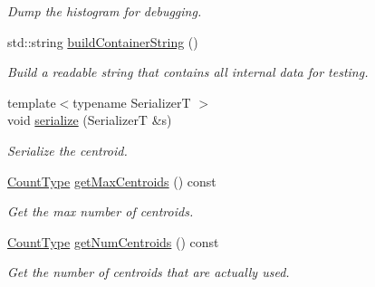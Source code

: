 \begin{DoxyCompactItemize}
\begin{DoxyCompactList}\small\item\em Dump the histogram for debugging. \end{DoxyCompactList}\item 
std\+::string \hyperlink{structvt_1_1util_1_1adt_1_1_histogram_approx_ada0f64fb2e7d5f1e7827bec2762a1291}{build\+Container\+String} ()
\begin{DoxyCompactList}\small\item\em Build a readable string that contains all internal data for testing. \end{DoxyCompactList}\item 
{\footnotesize template$<$typename SerializerT $>$ }\\void \hyperlink{structvt_1_1util_1_1adt_1_1_histogram_approx_aae8a321f42f550b711aeeb50ac8ef913}{serialize} (SerializerT \&s)
\begin{DoxyCompactList}\small\item\em Serialize the centroid. \end{DoxyCompactList}\item 
\hyperlink{structvt_1_1util_1_1adt_1_1_histogram_approx_aa2fb74665588d311da76dd821f2912c6}{Count\+Type} \hyperlink{structvt_1_1util_1_1adt_1_1_histogram_approx_a5b6af36eb1219d09bf17349731ed66ff}{get\+Max\+Centroids} () const
\begin{DoxyCompactList}\small\item\em Get the max number of centroids. \end{DoxyCompactList}\item 
\hyperlink{structvt_1_1util_1_1adt_1_1_histogram_approx_aa2fb74665588d311da76dd821f2912c6}{Count\+Type} \hyperlink{structvt_1_1util_1_1adt_1_1_histogram_approx_acdc73bd403084f66fc7d6011e4853ff6}{get\+Num\+Centroids} () const
\begin{DoxyCompactList}\small\item\em Get the number of centroids that are actually used. \end{DoxyCompactList}\end{DoxyCompactItemize}
